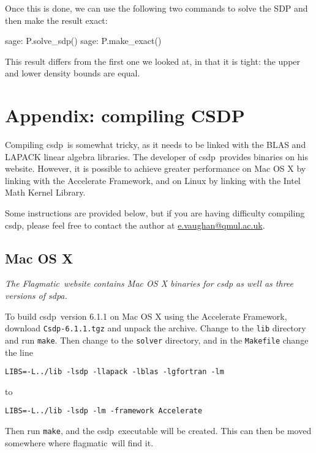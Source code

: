 \documentclass{article}
\let\temptt\texttt
\renewcommand\texttt[1]{{\color{excolor} \temptt{#1}}}
\providecommand{\flagmatic}{Flagmatic}
\providecommand{\flagmaticexe}{flagmatic}
\providecommand{\csdp}{csdp}
\begin{document}
Once this is done, we can use the following two commands to solve the SDP and then make the result exact:

\begin{sage}
sage: P.solve_sdp()
sage: P.make_exact()
\end{sage}

This result differs from the first one we looked at, in that it is tight: the upper and lower density bounds are equal.


\section{Appendix: compiling CSDP} \label{csdp}

Compiling \csdp\ is somewhat tricky, as it needs to be linked with the BLAS and LAPACK linear algebra libraries. The developer of \csdp\ provides binaries on his website. However, it is possible to achieve greater performance on Mac OS X by linking with the Accelerate Framework, and on Linux by linking with the Intel Math Kernel Library.

Some instructions are provided below, but if you are having difficulty compiling \csdp, please feel free to contact the author at \url{e.vaughan@qmul.ac.uk}.

\subsection{Mac OS X}

\textit{The \flagmatic\ website contains Mac OS X binaries for csdp as well as three versions of sdpa.}

To build \csdp\ version 6.1.1 on Mac OS X using the Accelerate Framework, download \texttt{Csdp-6.1.1.tgz} and unpack the archive. Change to the \texttt{lib} directory and run \texttt{make}. Then change to the \texttt{solver} directory, and in the \texttt{Makefile} change the line

\begin{verbatim}
LIBS=-L../lib -lsdp -llapack -lblas -lgfortran -lm
\end{verbatim}

to

\begin{verbatim}
LIBS=-L../lib -lsdp -lm -framework Accelerate
\end{verbatim}

Then run \texttt{make}, and the \csdp\ executable will be created. This can then be moved somewhere where \flagmaticexe\ will find it.
\end{document}
